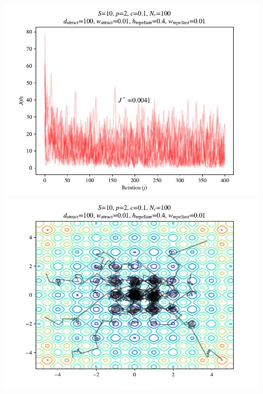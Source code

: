 \documentclass{beamer}
\begin{document}
\begin{frame}
\begin{columns}
\begin{center}
    \includegraphics[scale=0.3]{assets/rastrigin_colony_400_J}
    \includegraphics[scale=0.3]{assets/rastrigin_colony_400_theta}
  \end{center}
\end{columns}
\end{frame}
\end{document}
